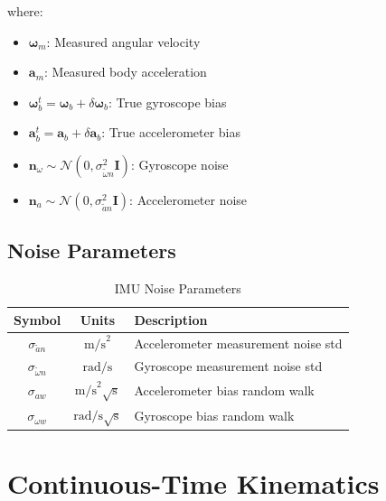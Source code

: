 \documentclass[11pt,a4paper]{article}
\newcommand{\bgyr}{\bm{\omega}_b}
\newcommand{\bacc}{\mathbf{a}_b}
\newcommand{\I}{\mathbf{I}}
\begin{document}
where:
\begin{itemize}
    \item $\bm{\omega}_m$: Measured angular velocity
    \item $\mathbf{a}_m$: Measured body acceleration
    \item $\bgyr^t = \bgyr + \delta\bgyr$: True gyroscope bias
    \item $\bacc^t = \bacc + \delta\bacc$: True accelerometer bias
    \item $\mathbf{n}_\omega \sim \mathcal{N}(0, \sigma_{\tilde{\omega}n}^2 \I)$: Gyroscope noise
    \item $\mathbf{n}_a \sim \mathcal{N}(0, \sigma_{\tilde{a}n}^2 \I)$: Accelerometer noise
\end{itemize}

\subsection{Noise Parameters}
\begin{table}[h]
\centering
\begin{tabular}{ccl}
\toprule
Symbol & Units & Description \\
\midrule
$\sigma_{\tilde{a}n}$ & $\text{m/s}^2$ & Accelerometer measurement noise std \\
$\sigma_{\tilde{\omega}n}$ & $\text{rad/s}$ & Gyroscope measurement noise std \\
$\sigma_{aw}$ & $\text{m/s}^2\sqrt{\text{s}}$ & Accelerometer bias random walk \\
$\sigma_{\omega w}$ & $\text{rad/s}\sqrt{\text{s}}$ & Gyroscope bias random walk \\
\bottomrule
\end{tabular}
\caption{IMU Noise Parameters}
\end{table}

\section{Continuous-Time Kinematics}
\end{document}
